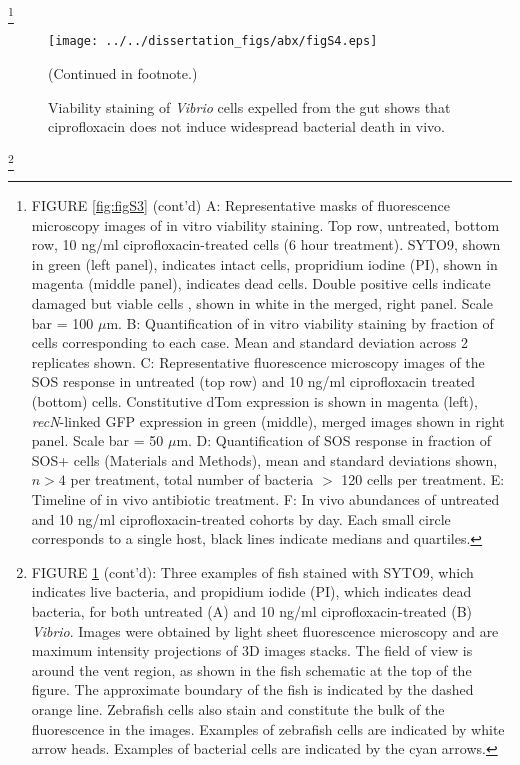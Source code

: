 {\let\thefootnote\relax\footnote{FIGURE \ref{fig:figS3} (cont'd) A: Representative masks of fluorescence microscopy images of in vitro viability staining. Top row, untreated, bottom row, 10 ng/ml ciprofloxacin-treated cells (6 hour treatment). SYTO9, shown in green (left panel), indicates intact cells, propridium iodine (PI), shown in magenta (middle panel), indicates dead cells. Double positive cells indicate damaged but viable cells \cite{ben2005genetic}, shown in white in the merged, right panel. Scale bar = 100 $\mu$m. B: Quantification of in vitro viability staining by fraction of cells corresponding to each case. Mean and standard deviation across 2 replicates shown. C: Representative fluorescence microscopy images of the SOS response in untreated (top row) and 10 ng/ml ciprofloxacin treated (bottom) cells. Constitutive dTom expression is shown in magenta (left), \textit{recN}-linked GFP expression in green (middle), merged images shown in right panel. Scale bar = 50 $\mu$m. D: Quantification of SOS response in fraction of SOS+ cells (Materials and Methods), mean and standard deviations shown, $n>4$ per treatment, total number of bacteria $>$ 120 cells per treatment. E: Timeline of in vivo antibiotic treatment. F: In vivo abundances of untreated and 10 ng/ml ciprofloxacin-treated cohorts by day. Each small circle corresponds to a single host, black lines indicate medians and quartiles.}


\begin{figure}[H]
	\centerline{
		\texttt{[image: ../../dissertation\_figs/abx/figS4.eps]}}
	\caption{Viability staining of \textit{Vibrio} cells expelled from the gut shows that ciprofloxacin does not induce widespread bacterial death in vivo.}{(Continued in footnote.)}
	\label{fig:figS4}
\end{figure}

{\let\thefootnote\relax\footnote{FIGURE \ref{fig:figS4} (cont'd): Three examples of fish stained with SYTO9, which indicates live bacteria, and propidium iodide (PI), which indicates dead bacteria, for both untreated (A) and 10 ng/ml ciprofloxacin-treated (B) \textit{Vibrio}. Images were obtained by light sheet fluorescence microscopy and are maximum intensity projections of 3D images stacks. The field of view is around the vent region, as shown in the fish schematic at the top of the figure. The approximate boundary of the fish is indicated by the dashed orange line. Zebrafish cells also stain and constitute the bulk of the fluorescence in the images. Examples of zebrafish cells are indicated by white arrow heads. Examples of bacterial cells are indicated by the cyan arrows.}
		
}}
